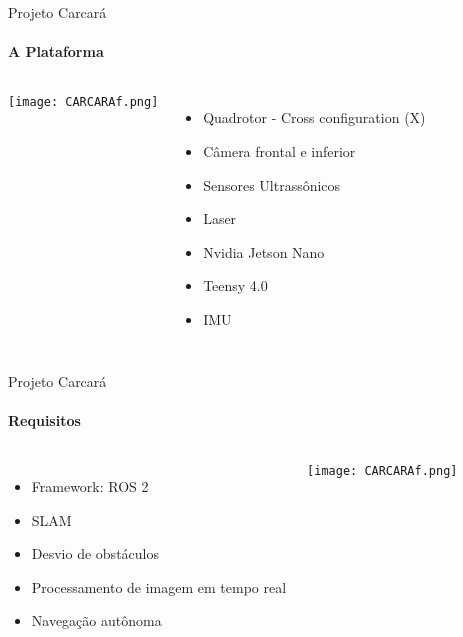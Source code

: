 \begin{frame}[t]{Projeto Carcará}
    \framesubtitle{A Plataforma}
    \transdissolve[duration=0.5]
    \begin{columns}
        \vspace*{0.4cm}
        \texttt{[image: CARCARAf.png]}
        \begin{itemize}
            \item Quadrotor - Cross configuration (X)
            \item Câmera frontal e inferior
            \item Sensores Ultrassônicos
            \item Laser
            \item Nvidia Jetson Nano
            \item Teensy 4.0
            \item IMU
        \end{itemize}
    \end{columns}
    
    
\end{frame}
\begin{frame}[t]{Projeto Carcará}
    \framesubtitle{Requisitos}
    \transdissolve[duration=0.5]
    \begin{columns}
        \begin{itemize}
            \item Framework: ROS 2
            \item SLAM
            \item Desvio de obstáculos
            \item Processamento de imagem em tempo real 
            \item Navegação autônoma
        \end{itemize}
        \vspace*{0.4cm}
        \texttt{[image: CARCARAf.png]}
    
    \end{columns}
    
    
\end{frame}
